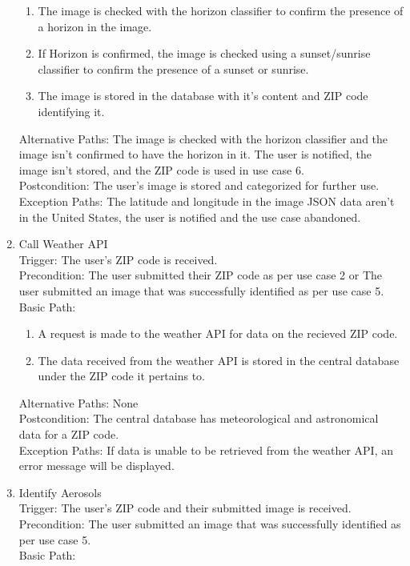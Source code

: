 \documentclass[journal,10pt,draftclsnofoot,onecolumn]{IEEEtran}
\begin{document}
\begin{singlespace}
\begin{enumerate}
\begin{enumerate}
\item The image is checked with the horizon classifier to confirm the presence of a horizon in the image.
\item If Horizon is confirmed, the image is checked using a sunset/sunrise classifier to confirm the presence of a sunset or sunrise.
\item The image is stored in the database with it's content and ZIP code identifying it.
\end{enumerate}
Alternative Paths: The image is checked with the horizon classifier and the image isn't confirmed to have the horizon in it. The user is notified, the image isn't stored, and the ZIP code is used in use case 6.\\
Postcondition: The user's image is stored and categorized for further use.\\
Exception Paths: The latitude and longitude in the image JSON data aren't in the United States, the user is notified and the use case abandoned.
\\
\item Call Weather API\\
Trigger: The user's ZIP code is received.\\
Precondition: The user submitted their ZIP code as per use case 2 or The user submitted an image that was successfully identified as per use case 5.\\
Basic Path:\begin{enumerate}
\item A request is made to the weather API for data on the recieved ZIP code.
\item The data received from the weather API is stored in the central database under the ZIP code it pertains to.
\end{enumerate}
Alternative Paths: None\\
Postcondition: The central database has meteorological and astronomical data for a ZIP code.\\
Exception Paths: If data is unable to be retrieved from the weather API, an error message will be displayed.
\\
\item Identify Aerosols\\
Trigger: The user's ZIP code and their submitted image is received.\\
Precondition: The user submitted an image that was successfully identified as per use case 5.\\
Basic Path:\begin{enumerate}

\end{enumerate}
\end{enumerate}
\end{singlespace}
\end{document}
